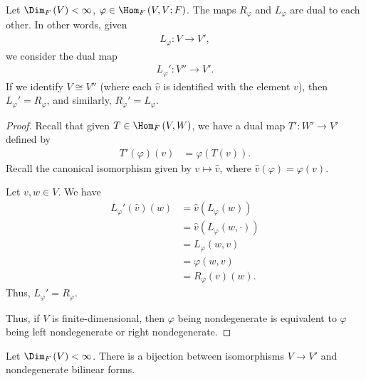 \documentclass[10pt]{mypackage}
\begin{document}
  \begin{theorem}
    Let $\Dim_{F}\left(V\right) < \infty$, $\varphi\in \Hom_{F}\left(V,V;F\right)$. The maps $R_{\varphi}$ and $L_{\varphi}$ are dual to each other. In other words, given
    \begin{align*}
      L_{\varphi}: V \rightarrow V',
    \end{align*}
    we consider the dual map
    \begin{align*}
      L_{\varphi}': V'' \rightarrow V'.
    \end{align*}
    If we identify $V\cong V''$ (where each $\hat{v}$ is identified with the element $v$), then $L_{\varphi}' = R_{\varphi}$, and similarly, $R_{\varphi}' = L_{\varphi}$.
  \end{theorem}
  \begin{proof}
    Recall that given $T\in \Hom_{F}\left(V,W\right)$, we have a dual map $T': W'\rightarrow V'$ defined by
    \begin{align*}
      T'\left(\varphi\right)\left(v\right) &= \varphi\left(T\left(v\right)\right).
    \end{align*}
    Recall the canonical isomorphism given by $v\mapsto \hat{v}$, where $\hat{v}\left(\varphi\right) = \varphi\left(v\right)$.\newline

    Let $v,w\in V$. We have
    \begin{align*}
      L_{\varphi}'\left(\hat{v}\right)\left(w\right) &= \hat{v}\left(L_{\varphi}\left(w\right)\right)\\
                                                     &= \hat{v}\left(L_{\varphi}\left(w,\cdot\right)\right)\\
                                                     &= L_{\varphi}\left(w,v\right)\\
                                                     &= \varphi\left(w,v\right)\\
                                                     &= R_{\varphi}\left(v\right)\left(w\right).
    \end{align*}
    Thus, $L_{\varphi}' = R_{\varphi}$.\newline

    Thus, if $V$ is finite-dimensional, then $\varphi$ being nondegenerate is equivalent to $\varphi$ being left nondegenerate or right nondegenerate.
  \end{proof}
  \begin{lemma}
    Let $\Dim_{F}\left(V\right) < \infty$. There is a bijection between isomorphisms $V \rightarrow V'$ and nondegenerate bilinear forms.
  \end{lemma}
\end{document}

